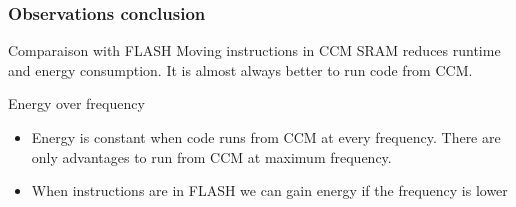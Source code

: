 \documentclass[
	11pt, %
]{beamer}
\begin{document}
\begin{frame}
	\frametitle{Observations conclusion}
	\begin{block}{Comparaison with FLASH} %
		Moving instructions in CCM SRAM reduces runtime and energy consumption.
		It is almost always better to run code from CCM.
	\end{block}
	\begin{block}{Energy over frequency} %
		\begin{itemize}
			\item Energy is constant when code runs from CCM at every frequency. There are
			only advantages to run from CCM at maximum frequency.
			\item When instructions are in FLASH we can gain energy if the
			frequency is lower
		\end{itemize}
	\end{block}
\end{frame}
\end{document}
